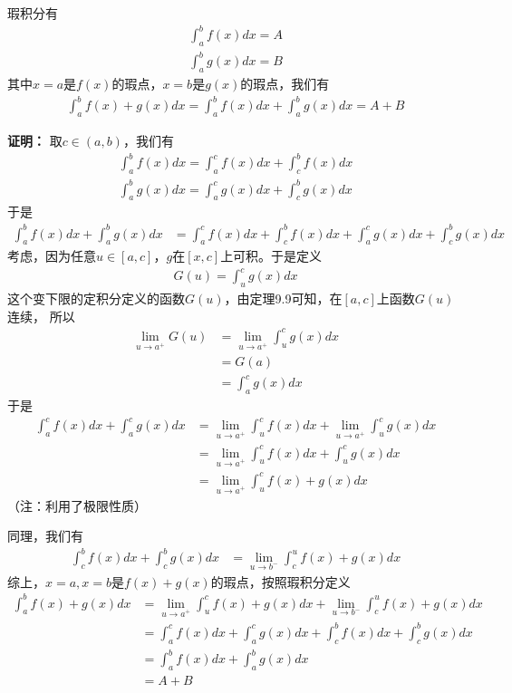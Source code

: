 \documentclass{article}
\begin{document}
\begin{zremark}
  瑕积分有
  \begin{align*}
    \int_{a}^{b} f(x) dx = A \\
    \int_{a}^{b} g(x) dx = B
  \end{align*}
  其中$x = a$是$f(x)$的瑕点，$x=b$是$g(x)$的瑕点，我们有
  \begin{align*}
    \int_{a}^{b} f(x) + g(x) dx = \int_{a}^{b} f(x) dx + \int_{a}^{b} g(x) dx = A + B
  \end{align*}
\end{zremark}

\textbf{证明：}
取$c \in (a,b)$，我们有
\begin{align*}
  \int_{a}^{b} f(x) dx = \int_{a}^{c} f(x) dx + \int_{c}^{b} f(x) dx \\
  \int_{a}^{b} g(x) dx = \int_{a}^{c} g(x) dx + \int_{c}^{b} g(x) dx
\end{align*}
于是
\begin{align*}
  \int_{a}^{b} f(x) dx + \int_{a}^{b} g(x) dx
   & = \int_{a}^{c} f(x) dx + \int_{c}^{b} f(x) dx + \int_{a}^{c} g(x) dx + \int_{c}^{b} g(x) dx
\end{align*}
考虑，因为任意$u \in [a, c]$，$g$在$[x, c]$上可积。于是定义
\begin{align*}
  G(u) = \int_{u}^{c} g(x) dx
\end{align*}
这个变下限的定积分定义的函数$G(u)$，由定理9.9可知，在$[a, c]$上函数$G(u)$连续，
所以
\begin{align*}
  \lim\limits_{u \to a^+} G(u)
   & = \lim\limits_{u \to a^+} \int_{u}^{c} g(x) dx \\
   & = G(a)                                         \\
   & = \int_{a}^{c} g(x) dx
\end{align*}
于是
\begin{align*}
  \int_{a}^{c} f(x) dx + \int_{a}^{c} g(x) dx
   & = \lim\limits_{u \to a^+} \int_{u}^{c} f(x) dx + \lim\limits_{u \to a^+} \int_{u}^{c} g(x) dx \\
   & = \lim\limits_{u \to a^+} \int_{u}^{c} f(x) dx + \int_{u}^{c} g(x) dx                         \\
   & = \lim\limits_{u \to a^+} \int_{u}^{c} f(x) + g(x) dx
\end{align*}
（注：利用了极限性质）

同理，我们有
\begin{align*}
  \int_{c}^{b} f(x) dx + \int_{c}^{b} g(x) dx
   & = \lim\limits_{u \to b^-} \int_{c}^{u} f(x) + g(x) dx
\end{align*}
综上，$x=a, x=b$是$f(x) + g(x)$的瑕点，按照瑕积分定义
\begin{align*}
  \int_{a}^{b} f(x) + g(x) dx
   & = \lim\limits_{u \to a^+} \int_{u}^{c} f(x) + g(x) dx + \lim\limits_{u \to b^-} \int_{c}^{u} f(x) + g(x) dx \\
   & = \int_{a}^{c} f(x) dx + \int_{a}^{c} g(x) dx + \int_{c}^{b} f(x) dx + \int_{c}^{b} g(x) dx                 \\
   & = \int_{a}^{b} f(x) dx + \int_{a}^{b} g(x) dx                                                               \\
   & = A + B
\end{align*}
\end{document}
